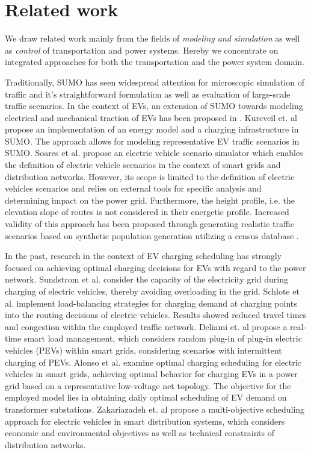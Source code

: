 \section{Related work}
\label{section:retrospection}

We draw related work mainly from the fields of \textit{modeling and simulation} as well as \textit{control} of transportation and power systems. Hereby we concentrate on integrated approaches for both the transportation and the power system domain.

Traditionally, SUMO \cite{behrisch2011sumo} has seen widespread attention for microscopic simulation of traffic and it's straightforward formulation as well as evaluation of large-scale traffic scenarios. In the context of EVs, an extension of SUMO towards modeling electrical and mechanical traction of EVs has been proposed in \cite{maia2011electric}. Kurcveil et. al \cite{kurczveil2014implementation} propose an implementation of an energy model and a charging infrastructure in SUMO. The approach allows for modeling representative EV traffic scenarios in SUMO. Soares et al. \cite{soares2012electric} propose an electric vehicle scenario simulator which enables the definition of electric vehicle scenarios in the context of smart grids and distribution networks. However, its scope is limited to the definition of electric vehicles scenarios and relies on external tools for specific analysis and determining impact on the power grid. Furthermore, the height profile, i.e. the elevation slope of routes is not considered in their energetic profile. Increased validity of this approach has been proposed through generating realistic traffic scenarios based on synthetic population generation utilizing a census database \cite{soares2014realistic}.

In the past, research in the context of EV charging scheduling has strongly focused on achieving optimal charging decisions for EVs with regard to the power network. Sundstrom et al. \cite{sundstrom2010planning} consider the capacity of the electricity grid during charging of electric vehicles, thereby avoiding overloading in the grid. Schlote et al. \cite{schlote2012balanced} implement load-balancing strategies for charging demand at charging points into the routing decisions of electric vehicles. Results showed reduced travel times and congestion within the employed traffic network. Deliami et. al \cite{deilami2011real} propose a real-time smart load management, which considers random plug-in of plug-in electric vehicles (PEVs) within smart grids, considering scenarios with intermittent charging of PEVs. Alonso et al. \cite{alonso2014optimal} examine optimal charging scheduling for electric vehicles in smart grids, achieving optimal behavior for charging EVs in a power grid based on a representative low-voltage net topology. The objective for the employed model lies in obtaining daily optimal scheduling of EV demand on transformer substations. Zakariazadeh et. al \cite{zakariazadeh2014multi} propose a multi-objective scheduling approach for electric vehicles in smart distribution systems, which considers economic and environmental objectives as well as technical constraints of distribution networks.

